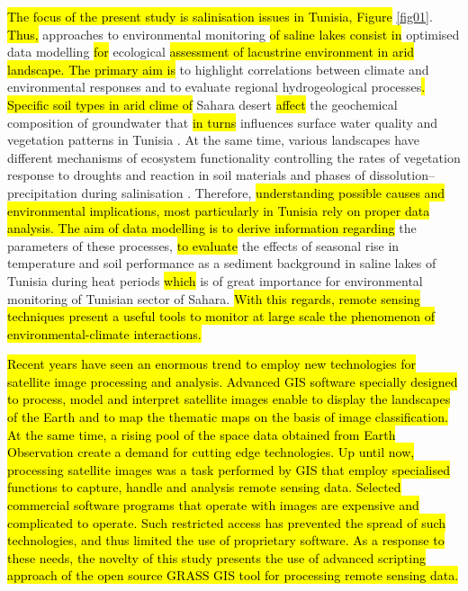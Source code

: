 \documentclass[land,article,submit,pdftex,moreauthors]{Definitions/mdpi}
\begin{document}
\hl{The focus of the present study is salinisation issues in Tunisia, Figure} \ref{fig01}. \hl{Thus,} approaches to environmental monitoring \hl{of saline lakes consist in} optimised data modelling \hl{for} ecological \hl{assessment of lacustrine environment in arid landscape. The primary aim is} to highlight correlations between climate and environmental responses \cite{BESSER2021104134} and to evaluate regional hydrogeological processes\hl{. Specific soil types in arid clime of} Sahara desert \hl{affect} the geochemical composition of groundwater that \hl{in turns }influences surface water quality and vegetation patterns in Tunisia \cite{HAMDI2021102974,RAFAATRIGUI2021104121}. At the same time, various landscapes have different mechanisms of ecosystem functionality controlling the rates of vegetation response to droughts and reaction in soil materials and phases of dissolution–precipitation during salinisation \cite{NAVARROTORRE2023105397}. Therefore, \hl{understanding possible causes and environmental implications, most particularly in Tunisia rely on proper data analysis. The aim of data modelling is to derive information regarding }the parameters of these processes, \hl{to evaluate }the effects of seasonal rise in temperature and soil performance as a sediment background in saline lakes of Tunisia during heat periods \hl{which }is of great importance for environmental monitoring of Tunisian sector of Sahara. \hl{With this regards, remote sensing techniques present a useful tools to monitor at large scale the phenomenon of environmental-climate interactions.}

\hl{Recent years have seen an enormous trend to employ new technologies for satellite image processing and analysis. Advanced GIS software specially designed to process, model and interpret satellite images enable to display the landscapes of the Earth and to map the thematic maps on the basis of image classification. At the same time, a rising pool of the space data obtained from Earth Observation create a demand for cutting edge technologies. Up until now, processing satellite images was a task performed by GIS that employ specialised functions to capture, handle and analysis remote sensing data. Selected commercial software programs that operate with images are expensive and complicated to operate. Such restricted access has prevented the spread of such technologies, and thus limited  the use of proprietary software. As a response to these needs, the novelty of this study presents the use of advanced scripting approach of the open source GRASS GIS tool for processing remote sensing data.}
\end{document}
